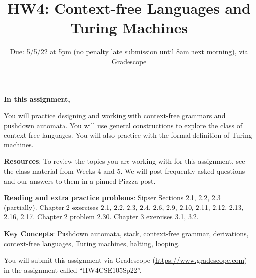 

\title{HW4: Context-free Languages and Turing Machines}
\date{Due: 5/5/22 at 5pm (no penalty late submission until 8am next morning), via Gradescope}


\maketitle
\thispagestyle{fancy}

{\bf In this assignment,}

You will practice designing and working with context-free grammars and 
pushdown automata. You will use general constructions to explore the class of context-free languages.
You will also practice with the formal definition of Turing machines.

{\bf Resources}: To review the topics you are working with 
for this assignment, see the class material from Weeks 4 and 5.
We will post frequently asked questions and our answers to them in a 
pinned Piazza post.

{\bf Reading and extra practice problems}: Sipser Sections 2.1, 2.2, 2.3 (partially).
Chapter 2 exercises 2.1, 2.2, 2.3, 2.4, 2.6, 2.9, 2.10, 2.11, 2.12, 2.13, 2.16, 2.17. Chapter 2 problem 2.30.
Chapter 3 exercises 3.1, 3.2.

{\bf Key Concepts}: Pushdown automata, stack, context-free grammar, derivations, context-free languages,
Turing machines, halting, looping.

\instructions

You will submit this assignment via Gradescope
(\href{https://www.gradescope.com}{https://www.gradescope.com}) 
in the assignment called ``HW4CSE105Sp22''.

